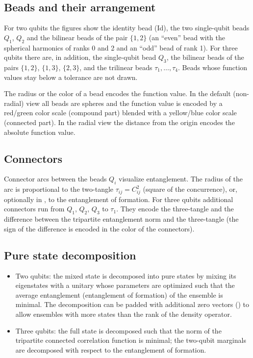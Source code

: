 \documentclass[11pt,a4paper]{article}
\newcommand{\code}[1]{\texttt{\detokenize{#1}}}
\begin{document}
\subsection{Beads and their arrangement}
For two qubits the figures show the identity bead (Id), the two single-qubit
beads $Q_1$, $Q_2$ and the bilinear beads of the pair $\{1,2\}$ (an
``even'' bead with the spherical harmonics of ranks 0 and 2 and an ``odd''
bead of rank 1). For three qubits there are, in addition, the single-qubit
bead $Q_3$, the bilinear beads of the pairs $\{1,2\}$, $\{1,3\}$, $\{2,3\}$,
and the trilinear beads $\tau_1,\dots,\tau_4$. Beads whose function values
stay below a tolerance are not drawn.

The radius or the color of a bead encodes the function value. In the default
(non-radial) view all beads are spheres and the function value is encoded by a
red/green color scale (compound part) blended with a yellow/blue color scale
(connected part). In the radial view the distance from the origin encodes the
absolute function value.

\subsection{Connectors}
Connector arcs between the beads $Q_i$ visualize entanglement. The radius of
the arc is proportional to the two-tangle $\tau_{ij}=C_{ij}^2$ (square of the
concurrence), or, optionally in \code{stacked_plot}, to the entanglement of
formation. For three qubits additional connectors run from $Q_1$, $Q_2$, $Q_3$
to $\tau_1$. They encode the three-tangle and the difference between the
tripartite entanglement norm and the three-tangle (the sign of the difference
is encoded in the color of the connectors).

\subsection{Pure state decomposition}
\begin{itemize}
  \item Two qubits: the mixed state is decomposed into pure states by mixing
        its eigenstates with a unitary whose parameters are optimized such
        that the average entanglement (entanglement of formation) of the
        ensemble is minimal. The decomposition can be padded with
        additional zero vectors (\code{PadVectors}) to allow ensembles with
        more states than the rank of the density operator.
  \item Three qubits: the full state is decomposed such that the norm of the
        tripartite connected correlation function is minimal; the
        two-qubit marginals are decomposed with respect to the entanglement
        of formation.
\end{itemize}
\end{document}
